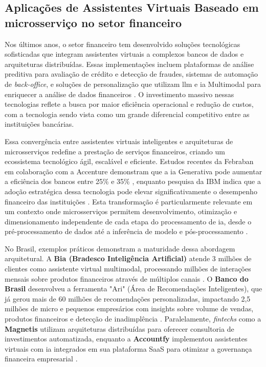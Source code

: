 \subsection{Aplicações de Assistentes Virtuais Baseado em microsserviço no setor financeiro}

Nos últimos anos, o setor financeiro tem desenvolvido soluções tecnológicas sofisticadas que integram assistentes virtuais a complexos bancos de dados e arquiteturas distribuídas. Essas implementações incluem plataformas de análise preditiva para avaliação de crédito e detecção de fraudes, sistemas de automação de \textit{back-office}, e soluções de personalização que utilizam \gls{llm} e \gls{ia} Multimodal para enriquecer a análise de dados financeiros \cite{febraban_estudo_2024}. O investimento massivo nessas tecnologias reflete a busca por maior eficiência operacional e redução de custos, com a tecnologia sendo vista como um grande diferencial competitivo entre as instituições bancárias.

Essa convergência entre assistentes virtuais inteligentes e arquiteturas de microsserviços redefine a prestação de serviços financeiros, criando um ecossistema tecnológico ágil, escalável e eficiente. Estudos recentes da Febraban em colaboração com a Accenture demonstram que a \gls{ia} Generativa pode aumentar a eficiência dos bancos entre 25\% e 35\% \cite{febraban_estudo_2024}, enquanto pesquisa da IBM indica que a adoção estratégica dessa tecnologia pode elevar significativamente o desempenho financeiro das instituições \cite{ibm_2025_2025}. Esta transformação é particularmente relevante em um contexto onde microsserviços permitem desenvolvimento, otimização e dimensionamento independente de cada etapa do processamento de \gls{ia}, desde o pré-processamento de dados até a inferência de modelo e pós-processamento \cite{nvidia_decodificando_2024}.

No Brasil, exemplos práticos demonstram a maturidade dessa abordagem arquitetural. A \textbf{Bia (Bradesco Inteligência Artificial)} atende 3 milhões de clientes como assistente virtual multimodal, processando milhões de interações mensais sobre produtos financeiros através de múltiplos canais \cite{valor_investe_os_2025}. O \textbf{Banco do Brasil} desenvolveu a ferramenta "Ari" (Área de Recomendações Inteligentes), que já gerou mais de 60 milhões de recomendações personalizadas, impactando 2,5 milhões de micro e pequenos empresários com insights sobre volume de vendas, produtos financeiros e detecção de inadimplência \cite{valor_investe_os_2025}. Paralelamente, \textit{fintechs} como a \textbf{Magnetis} utilizam arquiteturas distribuídas para oferecer consultoria de investimentos automatizada, enquanto a \textbf{Accountfy} implementou assistentes virtuais com \gls{ia} integrados em sua plataforma SaaS para otimizar a governança financeira empresarial \cite{accountfy_assistentes_2024}.

